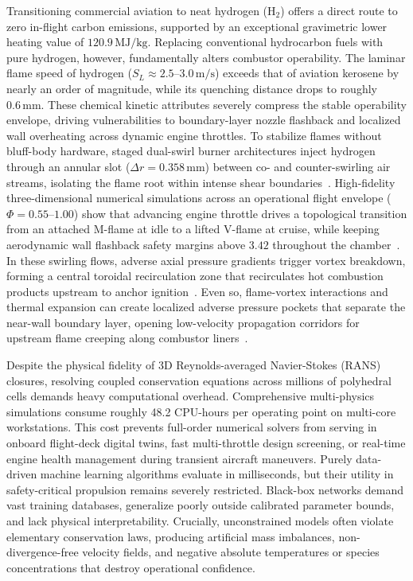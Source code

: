 \documentclass[reprint,aps,prfluids,superscriptaddress,twocolumn,floatfix]{revtex4-2}
\begin{document}
Transitioning commercial aviation to neat hydrogen ($\text{H}_2$) offers a direct route to zero in-flight carbon emissions, supported by an exceptional gravimetric lower heating value of $120.9\,\text{MJ/kg}$. Replacing conventional hydrocarbon fuels with pure hydrogen, however, fundamentally alters combustor operability. The laminar flame speed of hydrogen ($S_L \approx 2.5\text{--}3.0\,\text{m/s}$) exceeds that of aviation kerosene by nearly an order of magnitude, while its quenching distance drops to roughly $0.6\,\text{mm}$. These chemical kinetic attributes severely compress the stable operability envelope, driving vulnerabilities to boundary-layer nozzle flashback and localized wall overheating across dynamic engine throttles. To stabilize flames without bluff-body hardware, staged dual-swirl burner architectures inject hydrogen through an annular slot ($\Delta r = 0.358\,\text{mm}$) between co- and counter-swirling air streams, isolating the flame root within intense shear boundaries~\cite{govert2024experimental}. High-fidelity three-dimensional numerical simulations across an operational flight envelope ($\Phi = 0.55\text{--}1.00$) show that advancing engine throttle drives a topological transition from an attached M-flame at idle to a lifted V-flame at cruise, while keeping aerodynamic wall flashback safety margins above $3.42$ throughout the chamber~\cite{kamble2026aerothermo}. In these swirling flows, adverse axial pressure gradients trigger vortex breakdown, forming a central toroidal recirculation zone that recirculates hot combustion products upstream to anchor ignition~\cite{syred1974combustion}. Even so, flame-vortex interactions and thermal expansion can create localized adverse pressure pockets that separate the near-wall boundary layer, opening low-velocity propagation corridors for upstream flame creeping along combustor liners~\cite{kawai2026flashback}.

Despite the physical fidelity of 3D Reynolds-averaged Navier-Stokes (RANS) closures, resolving coupled conservation equations across millions of polyhedral cells demands heavy computational overhead. Comprehensive multi-physics simulations consume roughly 48.2 CPU-hours per operating point on multi-core workstations. This cost prevents full-order numerical solvers from serving in onboard flight-deck digital twins, fast multi-throttle design screening, or real-time engine health management during transient aircraft maneuvers. Purely data-driven machine learning algorithms evaluate in milliseconds, but their utility in safety-critical propulsion remains severely restricted. Black-box networks demand vast training databases, generalize poorly outside calibrated parameter bounds, and lack physical interpretability. Crucially, unconstrained models often violate elementary conservation laws, producing artificial mass imbalances, non-divergence-free velocity fields, and negative absolute temperatures or species concentrations that destroy operational confidence.
\end{document}
